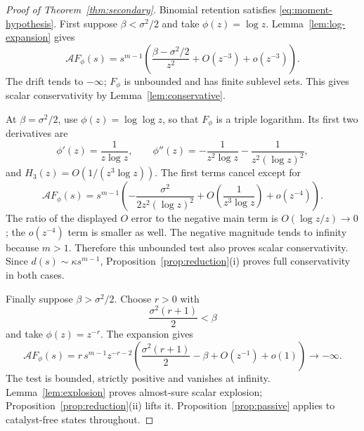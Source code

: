 \documentclass[11pt,a4paper]{article}
\theoremstyle{remark}\newtheorem{remark}[theorem]{Remark}
\newcommand{\A}{\mathcal A}
\begin{document}
\begin{proof}[Proof of Theorem~\ref{thm:secondary}]
Binomial retention satisfies \eqref{eq:moment-hypothesis}. First suppose $\beta<\sigma^2/2$ and take $\phi(z)=\log z$. Lemma~\ref{lem:log-expansion} gives
\begin{equation}\label{eq:secondary-subcritical}
\A F_\phi(s)=s^{m-1}
 \left(\frac{\beta-\sigma^2/2}{z^2}
       +O(z^{-3})+o(z^{-3})\right).
\end{equation}
The drift tends to $-\infty$; $F_\phi$ is unbounded and has finite sublevel sets. This gives scalar conservativity by Lemma~\ref{lem:conservative}.

At $\beta=\sigma^2/2$, use $\phi(z)=\log\log z$, so that $F_\phi$ is a triple logarithm. Its first two derivatives are
\[
\phi'(z)=\frac1{z\log z},\qquad
\phi''(z)=-\frac1{z^2\log z}-\frac1{z^2(\log z)^2},
\]
and $H_3(z)=O(1/(z^3\log z))$. The first terms cancel except for
\begin{equation}\label{eq:secondary-equality}
\A F_\phi(s)=s^{m-1}
 \left(-\frac{\sigma^2}{2z^2(\log z)^2}
       +O\!\left(\frac1{z^3\log z}\right)
       +o(z^{-4})\right).
\end{equation}
The ratio of the displayed $O$ error to the negative main term is
$O(\log z/z)\to0$; the $o(z^{-4})$ term is smaller as well. The negative magnitude tends to infinity because $m>1$. Therefore this unbounded test also proves scalar conservativity. Since $d(s)\sim\kappa s^{m-1}$, Proposition~\ref{prop:reduction}(i) proves full conservativity in both cases.

Finally suppose $\beta>\sigma^2/2$. Choose $r>0$ with
\[
\frac{\sigma^2(r+1)}2<\beta
\]
and take $\phi(z)=z^{-r}$. The expansion gives
\begin{equation}\label{eq:secondary-supercritical}
\A F_\phi(s)
=r\,s^{m-1}z^{-r-2}
 \left(\frac{\sigma^2(r+1)}2-\beta+O(z^{-1})+o(1)\right)
\longrightarrow-\infty.
\end{equation}
The test is bounded, strictly positive and vanishes at infinity. Lemma~\ref{lem:explosion} proves almost-sure scalar explosion; Proposition~\ref{prop:reduction}(ii) lifts it. Proposition~\ref{prop:passive} applies to catalyst-free states throughout.
\end{proof}
\end{document}
